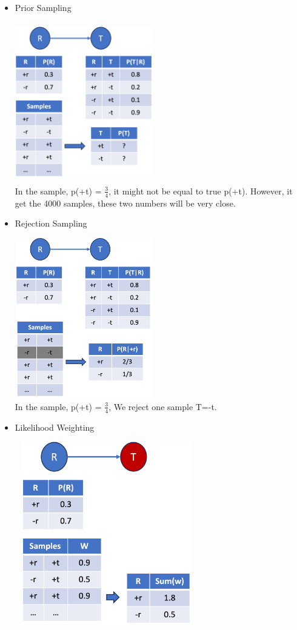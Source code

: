 \documentclass[11pt,a4paper]{report}
\begin{document}
\begin{itemize}
    \item Prior Sampling
    
    \includegraphics[width=6cm, height=7cm]{sampling_eg_prior.png}\\

    In the sample, p(+t) = $\frac{3}{4}$, it might not be equal to true p(+t). However, it get the 4000 samples, these two numbers will be very close.

    \item Rejection Sampling
    
    \includegraphics[width=6cm, height=7cm]{sampling_eg_rej.png}\\

    In the sample, p(+t) = $\frac{3}{4}$, We reject one sample T=-t.

    \item Likelihood Weighting
    
    \includegraphics[width=8cm, height = 8cm]{sampling_eg_lik.png}\\


\end{itemize}
\end{document}
